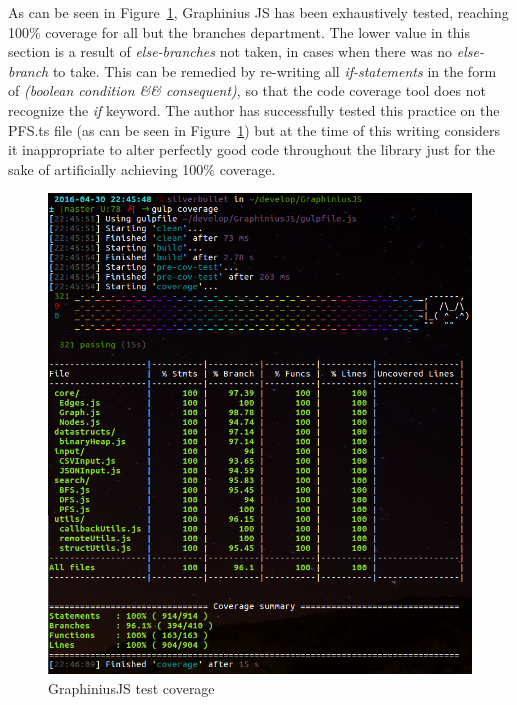 As can be seen in Figure~\ref{fig:test_coverage}, Graphinius JS has been exhaustively tested, reaching 100\% coverage for all but the branches department. The lower value in this section is a result of \textit{else-branches} not taken, in cases when there was no \textit{else-branch} to take. This can be remedied by re-writing all \textit{if-statements} in the form of \textit{(boolean condition \&\& consequent)}, so that the code coverage tool does not recognize the \textit{if} keyword. The author has successfully tested this practice on the PFS.ts file (as can be seen in Figure~\ref{fig:test_coverage}) but at the time of this writing considers it inappropriate to alter perfectly good code throughout the library just for the sake of artificially achieving 100\% coverage.

\begin{figure}[ht]
	\hspace*{-0.5cm}
	\includegraphics[width=1.1\textwidth]{figures/test_coverage}
	\caption{GraphiniusJS test coverage}
	\label{fig:test_coverage}
\end{figure}



